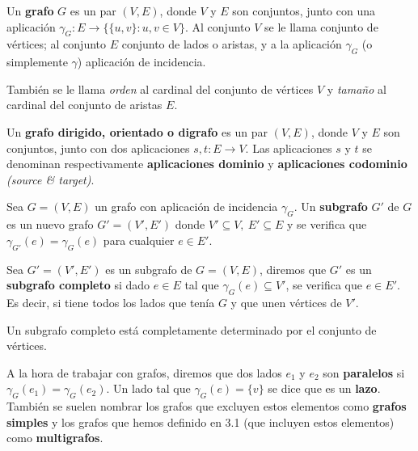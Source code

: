 \begin{ndef}[Grafo]
    Un \textbf{grafo} $G$ es un par $(V, E)$, donde $V$ y $E$ son conjuntos, junto con una aplicación $\gamma_G : E \rightarrow \{\{u,v\} : u,v \in V\}$.
    Al conjunto $V$ se le llama conjunto de vértices; al conjunto $E$ conjunto de lados o aristas, y a la aplicación $\gamma_G$ (o simplemente $\gamma$) aplicación de incidencia.
\end{ndef}
\begin{nota}
    También se le llama \textit{orden} al cardinal del conjunto de vértices $V$ y \textit{tamaño} al cardinal del conjunto de aristas  $E$.
\end{nota}

\begin{ndef}[Digrafo]
    Un \textbf{grafo dirigido, orientado o digrafo} es un par $(V,E)$, donde $V$ y $E$ son conjuntos, junto con dos aplicaciones $s,t : E \rightarrow V$. Las aplicaciones $s$ y $t$ se denominan respectivamente \textbf{aplicaciones dominio} y \textbf{aplicaciones codominio} \textit{(source \& target)}.
\end{ndef}

\begin{ndef}[Subgrafo]
    Sea $G = (V,E)$ un grafo con aplicación de incidencia $\gamma_G$. Un \textbf{subgrafo} $G'$ de $G$ es un nuevo grafo $G'=(V',E')$ donde $V' \subseteq V, \ E' \subseteq E$ y se verifica que $\gamma_{G'}(e) = \gamma_G(e)$ para cualquier $e \in E'$.
\end{ndef}

\begin{ndef}
    Sea $G' = (V', E')$ es un subgrafo de $G = (V, E)$, diremos que $G'$ es un \textbf{subgrafo completo} si dado $e \in E$ tal que $\gamma_G(e) \subseteq V'$, se verifica que $e \in E'$. Es decir, si tiene todos los lados que tenía $G$ y que unen vértices de $V'$.
\end{ndef}
\begin{obs}
    Un subgrafo completo está completamente determinado por el conjunto de vértices.
\end{obs}

A la hora de trabajar con grafos, diremos que dos lados $e_1$ y $e_2$ son \textbf{paralelos} si $\gamma_G(e_1) = \gamma_G(e_2)$. Un lado tal que $\gamma_G(e) = \{v\}$ se dice que es un \textbf{lazo}.
También se suelen nombrar los grafos que excluyen estos elementos como \textbf{grafos simples} y los grafos que hemos definido en 3.1 (que incluyen estos elementos) como \textbf{multigrafos}.

